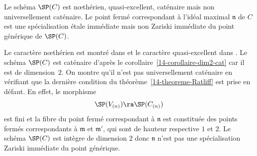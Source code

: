 \documentclass[10pt]{../fichiers-configuration-latex/smfart}
\begin{document}
\begin{proposition2}\label{14-propo-contre-ex} Le schéma $\SP(C)$ est nœthérien, quasi-excellent,
caténaire mais  non universellement caténaire. Le point fermé correspondant à l'idéal maximal
$\mathfrak{n}$ de $C$ est une spécialisation étale immédiate mais non Zariski immédiate du point
générique de $\SP(C)$.  \end{proposition2}

\begin{démo} Le caractère nœthérien est montré dans  et le caractère quasi-excellent
dans . Le schéma $\SP(C)$ est caténaire d'après le
corollaire~\ref{14-corollaire-dim2-cat} car il est de dimension~$2$. On montre qu'il n'est pas
universellement caténaire en vérifiant que la dernière condition du
théorème~\ref{14-theoreme-Ratliff} est prise en défaut. En effet, le morphisme
$$\SP(V_{(\mathfrak{n})}) \ra \SP(C_{(\mathfrak{n})})$$ est fini  et la fibre du point fermé
correspondant à $\mathfrak{n}$ est constituée des points fermés correspondants à $\mathfrak{m}$ et
$\mathfrak{m}'$, qui sont de hauteur respective $1$ et $2$. Le schéma $\SP(C)$ est intègre de
dimension $2$ donc $\mathfrak{n}$ n'est pas une spécialisation Zariski immédiate du point générique.
\end{démo}

\ifx\danslelivre\undefined


\end{document}
